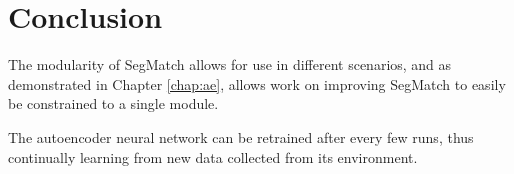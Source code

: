 \chapter{Conclusion}
\label{chap:conclusion}

The modularity of SegMatch allows for use in different scenarios, and as demonstrated in Chapter \ref{chap:ae}, allows work on improving SegMatch to easily be constrained to a single module.

The autoencoder neural network can be retrained after every few runs, thus continually learning from new data collected from its environment.
